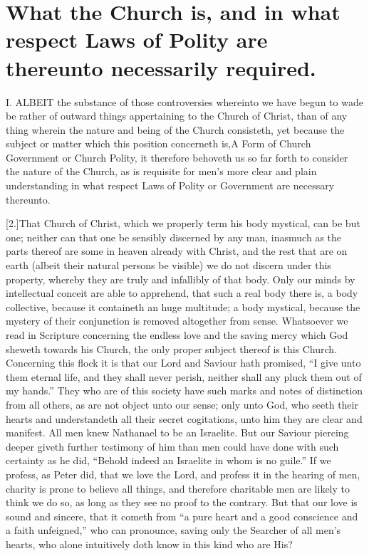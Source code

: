 \PRLsep

\section*{What the Church is, and in what respect Laws of Polity are thereunto necessarily required.}

I. ALBEIT the substance of those controversies whereinto we have begun to wade be rather of outward things appertaining to the Church of Christ, than of any thing wherein the nature and being of the Church consisteth, yet because the subject or matter which this position concerneth is,A Form of Church Government or Church Polity, it therefore behoveth us so far forth to consider the nature of the Church, as is requisite for men’s more clear and plain understanding in what respect Laws of Polity or Government are necessary thereunto.

[2.]That Church of Christ, which we properly term his body mystical, can be but one; neither can that one be sensibly discerned by any man, inasmuch as the parts thereof are some in heaven already with Christ, and the rest that are on earth (albeit their natural persons be visible) we do not discern under this property, whereby they are truly and infallibly of that body. Only our minds by intellectual conceit are able to apprehend, that such a real body there is, a body collective, because it containeth an huge multitude; a body mystical, because the mystery of their conjunction is removed altogether from sense. Whatsoever we read in Scripture concerning the endless love and the saving mercy which God sheweth towards his Church, the only proper subject thereof is this Church. Concerning this flock it is that our Lord and Saviour hath promised, “I give unto them eternal life, and they shall never perish, neither shall any pluck them out of my hands.” They who are of this society have such marks and notes of distinction from all others, as are not object unto our sense; only unto God, who seeth their hearts and understandeth all their secret cogitations, unto him they are clear and manifest. All men knew Nathanael to be an Israelite. But our Saviour piercing deeper giveth further testimony of him than men could have done with such certainty as he did, “Behold indeed an Israelite in whom is no guile.” If we profess, as Peter did, that we love the Lord, and profess it in the hearing of men, charity is prone to believe all things, and therefore charitable men are likely to think we do so, as long as they see no proof to the contrary.  But that our love is sound and sincere, that it cometh from “a pure heart and a good conscience and a faith unfeigned,” who can pronounce, saving only the Searcher of all men’s hearts, who alone intuitively doth know in this kind who are His?

